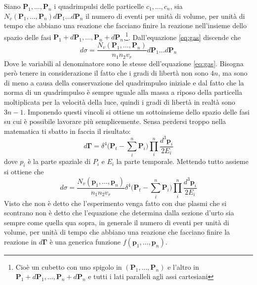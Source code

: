 \documentclass[11pt,a4paper]{report}
\newcommand{\vettore}[1]{\mathbf{#1}}
\begin{document}
		Siano $\vettore P_1,\dots, \vettore P_n$ i quadrimpulsi delle particelle $c_1,\dots,c_n$, sia \\$N_v(\vettore P_1,\dots,\vettore P_n)d\vettore P_1\dots d\vettore P_n$ il numero di eventi per unità di volume, per unità di tempo che abbiano una reazione che facciano finire la reazione nell'insieme dello spazio delle fasi $\vettore P_1+d\vettore P_1,\dots,\vettore P_n +d\vettore P_n $,\footnote{Cioè un cubetto con uno spigolo in $(\vettore P_1,\dots,\vettore P_n)$ e l'altro in $\vettore P_1+d\vettore P_1,\dots,\vettore P_n +d\vettore P_n $ e tutti i lati paralleli agli assi cartesiani}.\newline
		Dall'equazione \ref{eq:gas} discende che 
		\begin{equation}
			d\sigma=\frac{N_v(\vettore P_1,\dots,\vettore P_n)}{n_1n_2v_r}d\vettore P_1\dots d\vettore P_n
		\end{equation}
		Dove le variabili al denominatore sono le stesse dell'equazione \ref{eq:gas}.\newline
		Bisogna però tenere in considerazione il fatto che i gradi di libertà non sono $4n$, ma sono di meno a causa della conservazione del quadrimpulso iniziale e dal fatto che la norma di un quadrimpulso è sempre uguale alla massa a riposo della particella moltiplicata per la velocità della luce, quindi i gradi di libertà in realtà sono $3n-1$.\newline
		Imponendo questi vincoli si ottiene un sottoinsieme dello spazio delle fasi su cui è possibile lavorare più semplicemente. Sensa perdersi troppo nella matematica ti sbatto in faccia il risultato:
		\begin{equation}
			d\vettore \Gamma=\delta^4\bigg(\vettore P_t-\sum_i^n \vettore P_i\bigg)\prod_i^n\frac{d^3\vettore p_i}{2E_i}
		\end{equation}
		dove $p_i$ è la parte spaziale di $P_i$ e $E_i$ la parte temporale.\newline
		Mettendo tutto assieme si ottiene che 
		\begin{equation}
			d\sigma=\frac{N_v(\vettore p_1,\dots,\vettore p_n)}{n_1n_2v_r}\delta^4\bigg(\vettore P_t-\sum_i^n \vettore P_i\bigg)\prod_i^n\frac{d^3\vettore p_i}{2E_i}
		\end{equation}
		Visto che non è detto che l'esperimento venga fatto con due plasmi che si scontrano non è detto che l'equazione che determina dalla sezione d'urto sia sempre come quella qua sopra, in generale il numero di eventi per unità di volume, per unità di tempo che abbiano una reazione che facciano finire la reazione in $d\vettore \Gamma$ è una generica funzione $f(\vettore p_1,\dots,\vettore p_n)$.\newline
\end{document}
